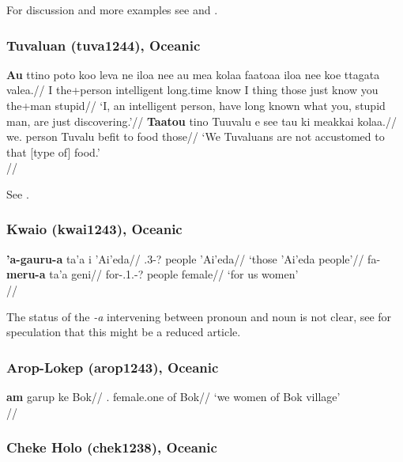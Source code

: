 \documentclass[A4paper]{article}
\begin{document}
For discussion and more examples see \citealp[368, 373]{bauer1993} and \citealp[262f.]{bauer1997}.

\subsubsection{Tuvaluan (tuva1244), Oceanic}

\pex \a
\begingl
\gla \textbf{Au} ttino poto koo leva ne iloa nee au mea kolaa faatoaa iloa nee koe ttagata valea.//
\glb I the+person intelligent \Pfv{} long.time \Pst{} know \Erg{} I thing those just know \Erg{} you the+man stupid//
\glft `I, an intelligent person, have long known what you, stupid man, are just discovering.'//
\endgl
\a\begingl
\gla \textbf{Taatou} tino Tuuvalu e see tau ki meakkai kolaa.//
\glb we.\Incl{} person Tuvalu \Npst{} \Neg{} befit to food those//
\glft `We Tuvaluans are not accustomed to that [type of] food.'\\\citep[after][393, (2018/2019)]{besnier2000}//
\endgl
\xe

See \citealp[392f.]{besnier2000}.

\subsubsection{Kwaio (kwai1243), Oceanic}

\pex
\a \begingl
\gla \textbf{'a-gauru-a} ta'a i 'Ai'eda//
\glb  \Fpron.3\Tri-? people \Loc{} 'Ai'eda//
\glft `those 'Ai'eda people'//
\endgl
\a
\begingl
\gla fa-\textbf{meru-a} ta'a geni//
\glb for-\Spron.1\Tri.\Excl-? people female//
\glft `for us women' \\\citep[after][104]{keesing1985}//
\endgl
\xe

The status of the \emph{-a} intervening between pronoun and noun is not clear, see \citet[25]{hoehn2020ThirdGap} for speculation that this might be a reduced article.

\subsubsection{Arop-Lokep (arop1243), Oceanic}

\ex
\begingl
\gla \textbf{am} garup ke Bok//
\Excl.\Pl{} female.one of Bok//
\glft `we women of Bok village'\\\citep[255]{djernes2002}//
\endgl
\xe


\subsubsection{Cheke Holo (chek1238), Oceanic}
\end{document}
